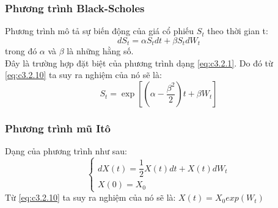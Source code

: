 \documentclass[14pt,a4paper]{article}
\numberwithin{equation}{section}
\begin{document}
\subsubsection{Phương trình Black-Scholes}
Phương trình mô tả sự biến động của giá cổ phiếu $S_t$ theo thời gian t:
\begin{equation}\label{eq:c3.2.11}
	dS_t=\alpha S_tdt+\beta S_tdW_t
\end{equation}
trong đó $\alpha$ và $\beta$ là những hằng số.\\
Đây là trường hợp đặt biệt của phương trình dạng \eqref{eq:c3.2.1}. Do đó từ \eqref{eq:c3.2.10} ta suy ra nghiệm của nó sẽ là:
\begin{equation}\label{eq:c3.2.12}
	S_t=\exp\left[\left(\alpha-\dfrac{\beta^2}{2} \right)t+\beta W_t \right]
\end{equation}
\subsubsection{Phương trình mũ Itô}
Dạng của phương trình như sau:
\begin{equation}\label{eq:c3.2.13}
	\begin{cases}
		dX(t)=\dfrac{1}{2}X(t)dt+X(t)dW_t\\
		X(0)=X_0
	\end{cases}
\end{equation}
Từ \eqref{eq:c3.2.10} ta suy ra nghiệm của nó sẽ là: $X(t)=X_0exp(W_t)$\\
\end{document}
